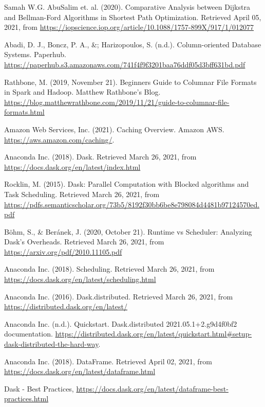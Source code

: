 \documentclass[11pt, oneside]{book}
\begin{document}
\begin{thebibliography}{111}
 Samah W.G. AbuSalim et. al. (2020). Comparative Analysis between Dijkstra and Bellman-Ford Algorithms in Shortest Path Optimization. Retrieved April 05, 2021, from \url{https://iopscience.iop.org/article/10.1088/1757-899X/917/1/012077}

 Abadi, D. J., Boncz, P. A., \&; Harizopoulos, S. (n.d.). Column-oriented Database Systems. Paperhub. \url{https://paperhub.s3.amazonaws.com/741f4f9f3201baa76ddf05d3bff631bd.pdf}

 Rathbone, M. (2019, November 21). Beginners Guide to Columnar File Formats in Spark and Hadoop. Matthew Rathbone's Blog. \url{https://blog.matthewrathbone.com/2019/11/21/guide-to-columnar-file-formats.html}

 Amazon Web Services, Inc. (2021). Caching Overview. Amazon AWS. \url{https://aws.amazon.com/caching/}. 

 Anaconda Inc. (2018). Dask. Retrieved March 26, 2021, from \url{https://docs.dask.org/en/latest/index.html}

 Rocklin, M. (2015). Dask: Parallel Computation with Blocked algorithms and Task Scheduling. Retrieved March 26, 2021, from \url{https://pdfs.semanticscholar.org/73b5/8192f30bb6be8e798084d4481b97124570ed.pdf}

 Böhm, S., \& Beránek, J. (2020, October 21). Runtime vs Scheduler: Analyzing Dask’s Overheads. Retrieved March 26, 2021, from \url{https://arxiv.org/pdf/2010.11105.pdf}

 Anaconda Inc. (2018). Scheduling. Retrieved March 26, 2021, from \url{https://docs.dask.org/en/latest/scheduling.html}

 Anaconda Inc. (2016). Dask.distributed. Retrieved March 26, 2021, from \url{https://distributed.dask.org/en/latest/}

 Anaconda Inc. (n.d.). Quickstart. Dask.distributed 2021.05.1+2.g9d4f0bf2 documentation. \url{https://distributed.dask.org/en/latest/quickstart.html#setup-dask-distributed-the-hard-way}. 

 Anaconda Inc. (2018). DataFrame. Retrieved April 02, 2021, from \url{https://docs.dask.org/en/latest/dataframe.html}

 Dask - Best Practices, \url{https://docs.dask.org/en/latest/dataframe-best-practices.html}


\end{thebibliography}
\end{document}
